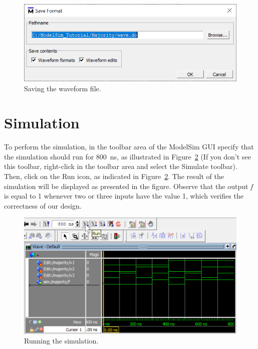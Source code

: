 \documentclass[11pt, twoside, pdftex]{article}
\begin{document}
\begin{figure}[H]
   \begin{center}
      \includegraphics[scale=1.0]{figures/figure24.png}
   \caption{Saving the waveform file.} 
	 \label{fig:24}
	 \end{center}
\end{figure}

\section{Simulation}

To perform the simulation, in the toolbar area of the ModelSim GUI specify that the simulation 
should run for 800~ns, as illustrated in Figure~\ref{fig:26} (If you don't see this toolbar, 
right-click in the toolbar area and select the {\sf Simulate} toolbar). Then, click on the
{\sf Run} icon, as indicated in Figure~\ref{fig:26}. The result of the simulation will be 
displayed as presented in the figure. Observe that the output {\it f} is equal to 1 whenever 
two or three inputs have the value 1, which verifies the correctness of our design.

\begin{figure}[H]
   \begin{center}
      \includegraphics[scale=0.75]{figures/sim_run.png}
   \caption{Running the simulation.} 
	 \label{fig:26}
	 \end{center}
\end{figure}
\end{document}
